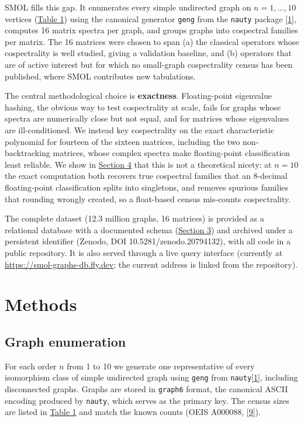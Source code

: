 \documentclass[
]{article}
\begin{document}
SMOL fills this gap. It enumerates every simple undirected graph on
\(n = 1, \ldots, 10\) vertices (\hyperref[tbl-census]{Table 1}) using
the canonical generator \texttt{geng} from the \texttt{nauty} package
{[}\hyperref[ref-mckay2014]{1}{]}, computes 16 matrix spectra per graph,
and groups graphs into cospectral families per matrix. The 16 matrices
were chosen to span (a) the classical operators whose cospectrality is
well studied, giving a validation baseline, and (b) operators that are
of active interest but for which no small-graph cospectrality census has
been published, where SMOL contributes new tabulations.

The central methodological choice is \textbf{exactness}. Floating-point
eigenvalue hashing, the obvious way to test cospectrality at scale,
fails for graphs whose spectra are numerically close but not equal, and
for matrices whose eigenvalues are ill-conditioned. We instead key
cospectrality on the exact characteristic polynomial for fourteen of the
sixteen matrices, including the two non-backtracking matrices, whose
complex spectra make floating-point classification least reliable. We
show in \hyperref[sec-validation]{Section 4} that this is not a
theoretical nicety: at \(n = 10\) the exact computation both recovers
true cospectral families that an 8-decimal floating-point classification
splits into singletons, and removes spurious families that rounding
wrongly created, so a float-based census mis-counts cospectrality.

The complete dataset (12.3 million graphs, 16 matrices) is provided as a
relational database with a documented schema
(\hyperref[sec-records]{Section 3}) and archived under a persistent
identifier (Zenodo, DOI 10.5281/zenodo.20794132), with all code in a
public repository. It is also served through a live query interface
(currently at \url{https://smol-graphs-db.fly.dev}; the current address
is linked from the repository).

\section{Methods}\label{sec-methods}

\subsection{Graph enumeration}\label{sec-enumeration}

For each order \(n\) from 1 to 10 we generate one representative of
every isomorphism class of simple undirected graph using \texttt{geng}
from \texttt{nauty}{[}\hyperref[ref-mckay2014]{1}{]}, including
disconnected graphs. Graphs are stored in \texttt{graph6} format, the
canonical ASCII encoding produced by \texttt{nauty}, which serves as the
primary key. The census sizes are listed in
\hyperref[tbl-census]{Table 1} and match the known counts (OEIS A000088,
{[}\hyperref[ref-oeis_a000088]{9}{]}).
\end{document}
